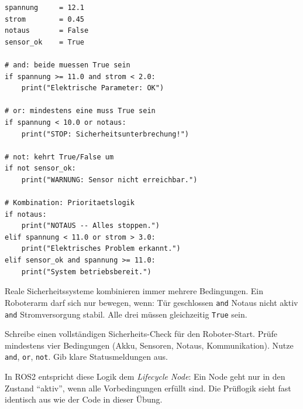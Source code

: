 \begin{lstlisting}
spannung     = 12.1
strom        = 0.45
notaus       = False
sensor_ok    = True

# and: beide muessen True sein
if spannung >= 11.0 and strom < 2.0:
    print("Elektrische Parameter: OK")

# or: mindestens eine muss True sein
if spannung < 10.0 or notaus:
    print("STOP: Sicherheitsunterbrechung!")

# not: kehrt True/False um
if not sensor_ok:
    print("WARNUNG: Sensor nicht erreichbar.")

# Kombination: Prioritaetslogik
if notaus:
    print("NOTAUS -- Alles stoppen.")
elif spannung < 11.0 or strom > 3.0:
    print("Elektrisches Problem erkannt.")
elif sensor_ok and spannung >= 11.0:
    print("System betriebsbereit.")
\end{lstlisting}

\begin{praxis}
Reale Sicherheitssysteme kombinieren immer mehrere Bedingungen. Ein Roboterarm darf sich nur bewegen, wenn: Tür geschlossen \texttt{and} Notaus nicht aktiv \texttt{and} Stromversorgung stabil. Alle drei müssen gleichzeitig \texttt{True} sein.
\end{praxis}

\begin{uebung}[title=Projektaufgabe Modul 2: Sicherheits-Check]
Schreibe einen vollständigen Sicherheits-Check für den Roboter-Start. Prüfe mindestens vier Bedingungen (Akku, Sensoren, Notaus, Kommunikation). Nutze \texttt{and}, \texttt{or}, \texttt{not}. Gib klare Statusmeldungen aus.
\end{uebung}

\begin{ros}
In ROS2 entspricht diese Logik dem \textit{Lifecycle Node}: Ein Node geht nur in den Zustand ``aktiv'', wenn alle Vorbedingungen erfüllt sind. Die Prüflogik sieht fast identisch aus wie der Code in dieser Übung.
\end{ros}

